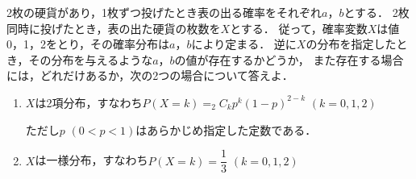 \documentclass[../../main.tex]{subfiles}
\begin{document}
2枚の硬貨があり，1枚ずつ投げたとき表の出る確率をそれぞれ$a$，$b$とする．
2枚同時に投げたとき，表の出た硬貨の枚数を$X$とする．
従って，確率変数$X$は値0，1，2をとり，その確率分布は$a$，$b$により定まる．
逆に$X$の分布を指定したとき，その分布を与えるような$a$，$b$の値が存在するかどうか，
また存在する場合には，どれだけあるか，次の2つの場合について答えよ．
\begin{enumerate}
  \item $X$は2項分布，すなわち$P(X=k)=_2C_kp^k{(1-p)}^{2-k}$ $(k=0,1,2)$

    ただし$p$ $(0<p<1)$はあらかじめ指定した定数である．
  \item $X$は一様分布，すなわち$\displaystyle P(X=k)=\dfrac{1}{3}$ $(k=0,1,2)$
\end{enumerate}
\end{document}
